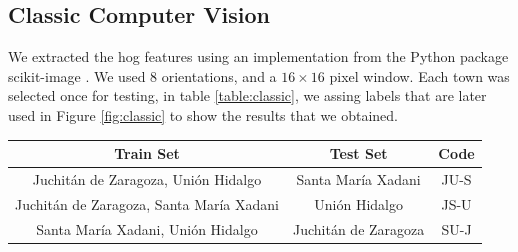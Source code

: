 \subsection{Classic Computer Vision}

We extracted the hog features using an implementation from the Python package scikit-image \cite{scikit-learn}. We used 8 orientations, and a $16\times16$ pixel window. Each town was selected once for testing, in table \ref{table:classic}, we assing labels that are later used in Figure \ref{fig:classic} to show the results that we obtained.


\begin{center}
  \begin{tabular}{|c|c|c|}
    \hline
    Train Set                                      &Test Set               &Code \\ \hline
    Juchit\'an de Zaragoza, Uni\'on Hidalgo        &Santa Mar\'ia Xadani   &JU-S \\ \hline
    Juchit\'an de Zaragoza, Santa Mar\'ia Xadani   &Uni\'on Hidalgo        &JS-U \\ \hline
    Santa Mar\'ia Xadani, Uni\'on Hidalgo          &Juchit\'an de Zaragoza &SU-J \\ 
    \hline
  \end{tabular}
  \label{table:classic}
\end{center}

